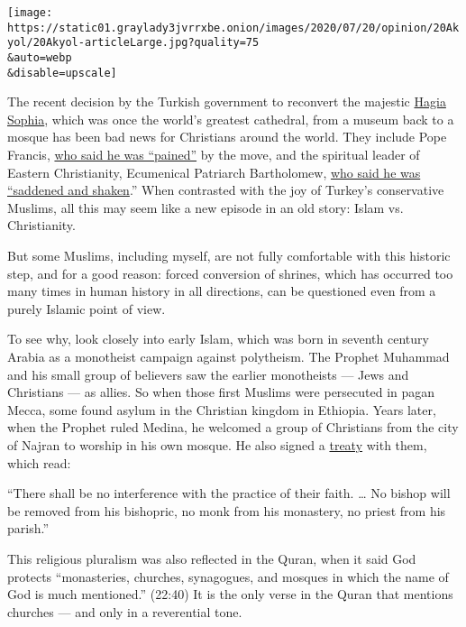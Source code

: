 \texttt{[image: https://static01.graylady3jvrrxbe.onion/images/2020/07/20/opinion/20Akyol/20Akyol-articleLarge.jpg?quality=75\\\&auto=webp\\\&disable=upscale]}

The recent decision by the Turkish government to reconvert the majestic
\href{https://www.nytimes3xbfgragh.onion/2020/07/24/world/europe/turkey-hagia-sophia-mosque-prayers.html}{Hagia
Sophia}, which was once the world's greatest cathedral, from a museum
back to a mosque has been bad news for Christians around the world. They
include Pope Francis,
\href{https://cruxnow.com/vatican/2020/07/pope-francis-pained-by-decision-to-turn-hagia-sophia-into-mosque/}{who
said he was ``pained''} by the move, and the spiritual leader of Eastern
Christianity, Ecumenical Patriarch Bartholomew,
\href{https://greekcitytimes.com/2020/06/25/ecumenical-patriarch-bartholomew-saddened-and-shaken-over-plans-to-convert-hagia-sophia-into-a-mosque/}{who
said he was ``saddened and shaken}.'' When contrasted with the joy of
Turkey's conservative Muslims, all this may seem like a new episode in
an old story: Islam vs. Christianity.

But some Muslims, including myself, are not fully comfortable with this
historic step, and for a good reason: forced conversion of shrines,
which has occurred too many times in human history in all directions,
can be questioned even from a purely Islamic point of view.

To see why, look closely into early Islam, which was born in seventh
century Arabia as a monotheist campaign against polytheism. The Prophet
Muhammad and his small group of believers saw the earlier monotheists
--- Jews and Christians --- as allies. So when those first Muslims were
persecuted in pagan Mecca, some found asylum in the Christian kingdom in
Ethiopia. Years later, when the Prophet ruled Medina, he welcomed a
group of Christians from the city of Najran to worship in his own
mosque. He also signed a
\href{https://www.amazon.com/Covenants-Prophet-Muhammad-Christians-World/dp/159731465X}{treaty}
with them, which read:

``There shall be no interference with the practice of their faith.
\ldots{} No bishop will be removed from his bishopric, no monk from his
monastery, no priest from his parish.''

This religious pluralism was also reflected in the Quran, when it said
God protects ``monasteries, churches, synagogues, and mosques in which
the name of God is much mentioned.'' (22:40) It is the only verse in the
Quran that mentions churches --- and only in a reverential tone.

